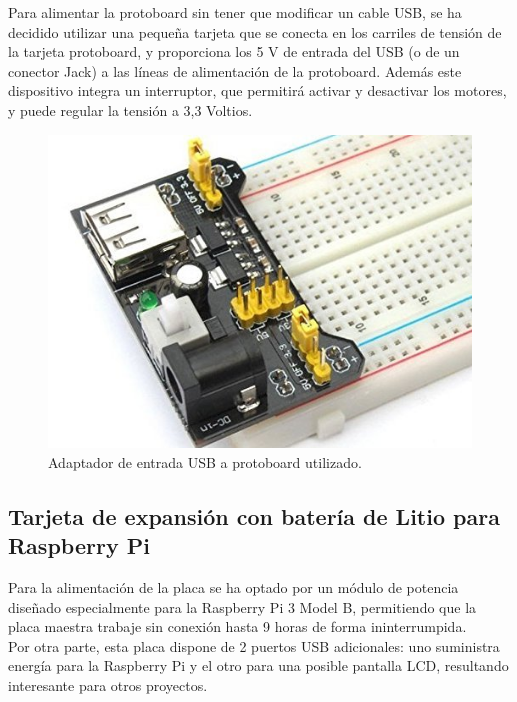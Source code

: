 Para alimentar la protoboard sin tener que modificar un cable USB, se ha decidido utilizar una pequeña tarjeta que se conecta en los carriles de tensión de la tarjeta protoboard, y
proporciona los 5 V de entrada del USB (o de un conector Jack) a las líneas de alimentación de la protoboard. Además este dispositivo integra un interruptor, que permitirá activar y
desactivar los motores, y puede regular la tensión a 3,3 Voltios.\\

\begin{figure}[H]
  \begin{center}
    \includegraphics[scale=0.3]{imagenes/alimentador_usb_protoboard.jpg}
  \end{center}
  \caption{Adaptador de entrada USB a protoboard utilizado.}
  \label{figura:alimentador_placa_usb_protoboard}
\end{figure}


\subsection{ Tarjeta de expansión con batería de Litio para Raspberry Pi }
\label{componente:bateria-expansion}

Para la alimentación de la placa se ha optado por un módulo de potencia diseñado especialmente para la Raspberry Pi 3 Model B, permitiendo que la placa maestra trabaje sin conexión hasta 9 horas
de forma ininterrumpida.\\

Por otra parte, esta placa dispone de 2 puertos USB adicionales: uno suministra energía para la Raspberry Pi y el otro para una posible pantalla LCD, resultando interesante para otros proyectos.\\

